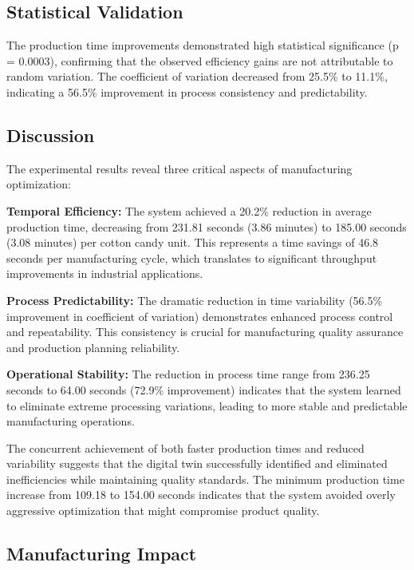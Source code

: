 \subsection{Statistical Validation}

The production time improvements demonstrated high statistical significance (p = 0.0003), confirming that the observed efficiency gains are not attributable to random variation. The coefficient of variation decreased from 25.5\% to 11.1\%, indicating a 56.5\% improvement in process consistency and predictability.

\subsection{Discussion}

The experimental results reveal three critical aspects of manufacturing optimization:

\textbf{Temporal Efficiency:} The system achieved a 20.2\% reduction in average production time, decreasing from 231.81 seconds (3.86 minutes) to 185.00 seconds (3.08 minutes) per cotton candy unit. This represents a time savings of 46.8 seconds per manufacturing cycle, which translates to significant throughput improvements in industrial applications.

\textbf{Process Predictability:} The dramatic reduction in time variability (56.5\% improvement in coefficient of variation) demonstrates enhanced process control and repeatability. This consistency is crucial for manufacturing quality assurance and production planning reliability.

\textbf{Operational Stability:} The reduction in process time range from 236.25 seconds to 64.00 seconds (72.9\% improvement) indicates that the system learned to eliminate extreme processing variations, leading to more stable and predictable manufacturing operations.

The concurrent achievement of both faster production times and reduced variability suggests that the digital twin successfully identified and eliminated inefficiencies while maintaining quality standards. The minimum production time increase from 109.18 to 154.00 seconds indicates that the system avoided overly aggressive optimization that might compromise product quality.

\subsection{Manufacturing Impact}

